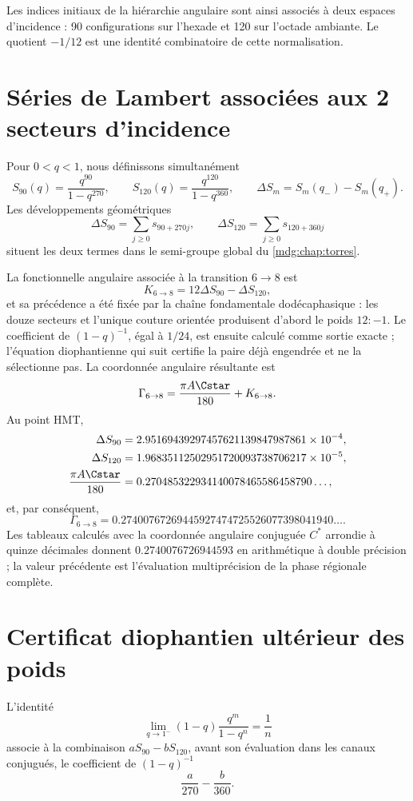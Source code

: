 Les indices initiaux de la hiérarchie angulaire sont ainsi associés à deux
espaces d’incidence : 90 configurations sur l’hexade et 120 sur
l’octade ambiante. Le quotient \(-1/12\) est une identité combinatoire de cette
normalisation.

\section{Séries de Lambert associées aux 2 secteurs d’incidence}

Pour \(0<q<1\), nous définissons simultanément
\[
 S_{90}(q)=\frac{q^{90}}{1-q^{270}},
 \qquad
 S_{120}(q)=\frac{q^{120}}{1-q^{360}},
 \qquad
 \Delta S_m=S_m(q_-)-S_m(q_+).
\]
Les développements géométriques
\[
 \Delta S_{90}=\sum_{j\geq0}s_{90+270j},
 \qquad
 \Delta S_{120}=\sum_{j\geq0}s_{120+360j}
\]
situent les deux termes dans le semi-groupe global du
\cref{mdg:chap:torres}.

La fonctionnelle angulaire associée à la transition \(6\to8\) est
\[
 K_{6\to8}=12\Delta S_{90}-\Delta S_{120},
\]
et sa précédence a été fixée par la chaîne fondamentale dodécaphasique :
les douze secteurs et l’unique couture orientée produisent d’abord le poids
\(12:-1\). Le coefficient de \((1-q)^{-1}\), égal à \(1/24\), est ensuite calculé comme sortie exacte ;
l’équation diophantienne qui suit certifie la paire déjà engendrée et ne la
sélectionne pas.
La coordonnée angulaire résultante est
\[
\Gamma_{6\to8}
=\frac{\pi A\Cstar}{180}+K_{6\to8}.
\]
Au point HMT,
\[
\begin{aligned}
 \Delta S_{90}&=2.95169439297457621139847987861\times10^{-4},\\
 \Delta S_{120}&=1.96835112502951720093738706217\times10^{-5},\\
 \frac{\pi A\Cstar}{180}&=0.270485322934140078465586458790\ldots,
\end{aligned}
\]
et, par conséquent,
\[
 \boxed{\Gamma_{6\to8}
 =0.27400767269445927474725526077398041940\ldots.}
\]
Les tableaux calculés avec la coordonnée angulaire conjuguée \(C^*\) arrondie à quinze décimales donnent
\(0.2740076726944593\) en arithmétique à double précision ; la valeur précédente
est l’évaluation multiprécision de la phase régionale complète.

\section{Certificat diophantien ultérieur des poids}

L’identité
\[
 \lim_{q\to1^-}(1-q)\frac{q^m}{1-q^n}=\frac1n
\]
associe à la combinaison \(aS_{90}-bS_{120}\), avant son évaluation
dans les canaux conjugués, le coefficient de \((1-q)^{-1}\)
\[
 \frac a{270}-\frac b{360}.
\]

